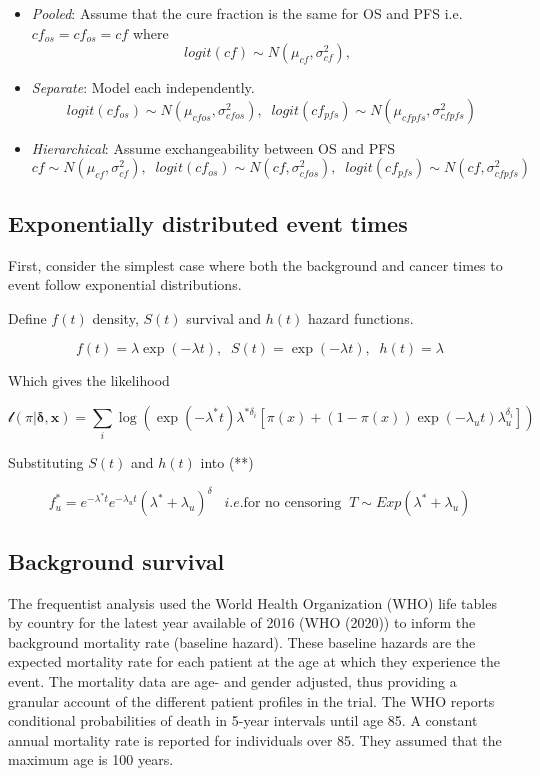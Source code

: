 \documentclass[
]{article}
\providecommand{\tightlist}{%
  \setlength{\itemsep}{0pt}\setlength{\parskip}{0pt}}
\begin{document}
\begin{itemize}
\tightlist
\item
  \emph{Pooled}: Assume that the cure fraction is the same for OS and
  PFS i.e.~\(cf_{os} = cf_{os} = cf\) where \[
  logit(cf) \sim N(\mu_{cf}, \sigma_{cf}^2), \;\;
  \]
\item
  \emph{Separate}: Model each independently. \[
  logit(cf_{os}) \sim N(\mu_{cfos}, \sigma_{cfos}^2), \;\;  
  logit(cf_{pfs}) \sim N(\mu_{cfpfs}, \sigma_{cfpfs}^2)  
  \]
\item
  \emph{Hierarchical}: Assume exchangeability between OS and PFS\[
  cf \sim N(\mu_{cf}, \sigma_{cf}^2), \;\;  
  logit(cf_{os}) \sim N(cf, \sigma_{cfos}^2), \;\;  
  logit(cf_{pfs}) \sim N(cf, \sigma_{cfpfs}^2)  
  \]
\end{itemize}

\hypertarget{exponentially-distributed-event-times}{%
\subsection{Exponentially distributed event
times}\label{exponentially-distributed-event-times}}

First, consider the simplest case where both the background and cancer
times to event follow exponential distributions.

Define \(f(t)\) density, \(S(t)\) survival and \(h(t)\) hazard
functions.

\[
f(t) = \lambda \exp(-\lambda t), \;\; S(t) = \exp(-\lambda t), \;\; h(t) = \lambda
\]

Which gives the likelihood

\[
\mathcal{l}(\pi | \boldsymbol{\delta}, \boldsymbol{x}) =
 \sum_i \log(\exp(-\lambda^* t) \lambda^{* \delta_i}[\pi(x) +
   (1 − \pi(x)) \exp(-\lambda_u t) \lambda_u^{\delta_i}])
\]

Substituting \(S(t)\) and \(h(t)\) into (**)

\[
f^*_u = e^{-\lambda^* t} e^{-\lambda_u t} (\lambda^* + \lambda_u)^{\delta} \;\;\; i.e. \mbox{for no censoring} \;\; T \sim Exp(\lambda^* + \lambda_u)
\]

\hypertarget{background-survival}{%
\subsection{Background survival}\label{background-survival}}

The frequentist analysis used the World Health Organization (WHO) life
tables by country for the latest year available of 2016 (WHO (2020)) to
inform the background mortality rate (baseline hazard). These baseline
hazards are the expected mortality rate for each patient at the age at
which they experience the event. The mortality data are age- and gender
adjusted, thus providing a granular account of the different patient
profiles in the trial. The WHO reports conditional probabilities of
death in 5-year intervals until age 85. A constant annual mortality rate
is reported for individuals over 85. They assumed that the maximum age
is 100 years.
\end{document}
